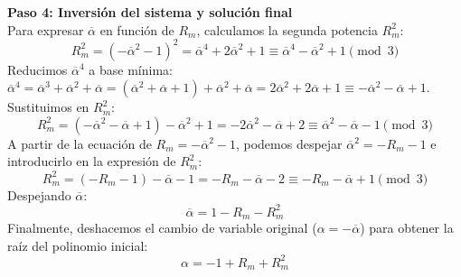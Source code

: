 \begin{enumerate}
\begin{dem}
\textbf{Paso 4: Inversión del sistema y solución final} \\
Para expresar $\overline{\alpha}$ en función de $R_m$, calculamos la segunda potencia $R_m^2$:
$$ R_m^2 = (-\overline{\alpha}^2 - 1)^2 = \overline{\alpha}^4 + 2\overline{\alpha}^2 + 1 \equiv \overline{\alpha}^4 - \overline{\alpha}^2 + 1 \pmod 3 $$
Reducimos $\overline{\alpha}^4$ a base mínima: $\overline{\alpha}^4 = \overline{\alpha}^3 + \overline{\alpha}^2 + \overline{\alpha} = (\overline{\alpha}^2 + \overline{\alpha} + 1) + \overline{\alpha}^2 + \overline{\alpha} = 2\overline{\alpha}^2 + 2\overline{\alpha} + 1 \equiv -\overline{\alpha}^2 - \overline{\alpha} + 1$. \\
Sustituimos en $R_m^2$:
$$ R_m^2 = (-\overline{\alpha}^2 - \overline{\alpha} + 1) - \overline{\alpha}^2 + 1 = -2\overline{\alpha}^2 - \overline{\alpha} + 2 \equiv \overline{\alpha}^2 - \overline{\alpha} - 1 \pmod 3 $$
A partir de la ecuación de $R_m = -\overline{\alpha}^2 - 1$, podemos despejar $\overline{\alpha}^2 = -R_m - 1$ e introducirlo en la expresión de $R_m^2$:
$$ R_m^2 = (-R_m - 1) - \overline{\alpha} - 1 = -R_m - \overline{\alpha} - 2 \equiv -R_m - \overline{\alpha} + 1 \pmod 3 $$
Despejando $\overline{\alpha}$:
$$ \overline{\alpha} = 1 - R_m - R_m^2 $$
Finalmente, deshacemos el cambio de variable original ($\alpha = -\overline{\alpha}$) para obtener la raíz del polinomio inicial:
$$ \alpha = -1 + R_m + R_m^2 $$
\end{dem}
\end{enumerate}
